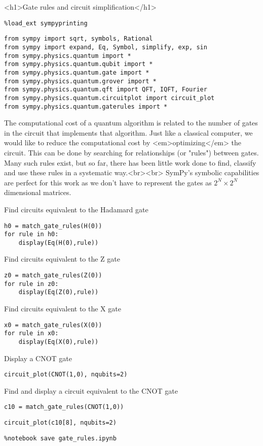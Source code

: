 <h1>Gate rules and circuit simplification</h1>

\begin{verbatim}
%load_ext sympyprinting
\end{verbatim}

\begin{verbatim}
from sympy import sqrt, symbols, Rational
from sympy import expand, Eq, Symbol, simplify, exp, sin
from sympy.physics.quantum import *
from sympy.physics.quantum.qubit import *
from sympy.physics.quantum.gate import *
from sympy.physics.quantum.grover import *
from sympy.physics.quantum.qft import QFT, IQFT, Fourier
from sympy.physics.quantum.circuitplot import circuit_plot
from sympy.physics.quantum.gaterules import *
\end{verbatim}

The computational cost of a quantum algorithm is related to the number of gates
in the circuit that implements that algorithm. Just like a classical computer,
we would like to reduce the computational cost by <em>optimizing</em> the
circuit. This can be done by searching for relationships (or "rules") between
gates. Many such rules exist, but so far, there has been little work done to
find, classify and use these rules in a systematic way.<br><br> SymPy's symbolic
capabilities are perfect for this work as we don't have to represent the gates
as $2^N\times2^N$ dimensional matrices.

Find circuits equivalent to the Hadamard gate

\begin{verbatim}
h0 = match_gate_rules(H(0))
for rule in h0:
    display(Eq(H(0),rule))
\end{verbatim}

Find circuits equivalent to the Z gate

\begin{verbatim}
z0 = match_gate_rules(Z(0))
for rule in z0:
    display(Eq(Z(0),rule))
\end{verbatim}

Find circuits equivalent to the X gate

\begin{verbatim}
x0 = match_gate_rules(X(0))
for rule in x0:
    display(Eq(X(0),rule))
\end{verbatim}

Display a CNOT gate

\begin{verbatim}
circuit_plot(CNOT(1,0), nqubits=2)

\end{verbatim}

Find and display a circuit equivalent to the CNOT gate

\begin{verbatim}
c10 = match_gate_rules(CNOT(1,0))
\end{verbatim}

\begin{verbatim}
circuit_plot(c10[8], nqubits=2)
\end{verbatim}

\begin{verbatim}
%notebook save gate_rules.ipynb
\end{verbatim}

\begin{verbatim}

\end{verbatim}

